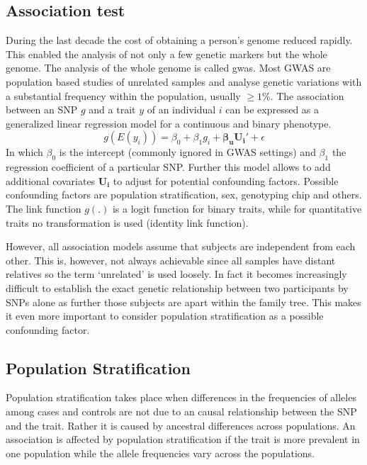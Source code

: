 \documentclass[../header.tex]{subfiles}
\begin{document}
\subsection{Association test}
\label{sub:association_test}

During the last decade the cost of obtaining a person's genome reduced rapidly.
This enabled the analysis of not only a few genetic markers but the whole genome.
The analysis of the whole genome is called \acrfull{gwas}.
Most GWAS are population based studies of unrelated samples and analyse genetic variations with a substantial frequency within the population, usually $\ge 1\%$.
The association between an SNP $g$ and a trait $y$ of an individual $i$ can be expressed as a generalized linear regression model for a continuous and binary phenotype.
\begin{equation}
  g(E(y_i)) = \beta_0 + \beta_1g_i + \pmb{\beta_u}\pmb{U_i'} + \epsilon
\end{equation}
In which $\beta_0$ is the intercept (commonly ignored in GWAS settings) and $\beta_1$ the regression coefficient of a particular SNP\@.
Further this model allows to add additional covariates $\pmb{U_i}$ to adjust for potential confounding factors.
Possible confounding factors are population stratification, sex, genotyping chip and others.
The link function $g(.)$ is a logit function for binary traits, while for quantitative traits no transformation is used (identity link function). 

However, all association models assume that subjects are independent from each other.
This is, however, not always achievable since all samples have distant relatives so the term `unrelated' is used loosely.
In fact it becomes increasingly difficult to establish the exact genetic relationship between two participants by SNPs alone as further those subjects are apart within the family tree.
This makes it even more important to consider population stratification as a possible confounding factor.

\subsection{Population Stratification}
\label{ssec:population_stratification}

Population stratification takes place when differences in the frequencies of alleles among cases and controls are not due to an causal relationship between the SNP and the trait.
Rather it is caused by ancestral differences across populations.
An association is affected by population stratification if the trait is more prevalent in one population while the allele frequencies vary across the populations.
\end{document}
